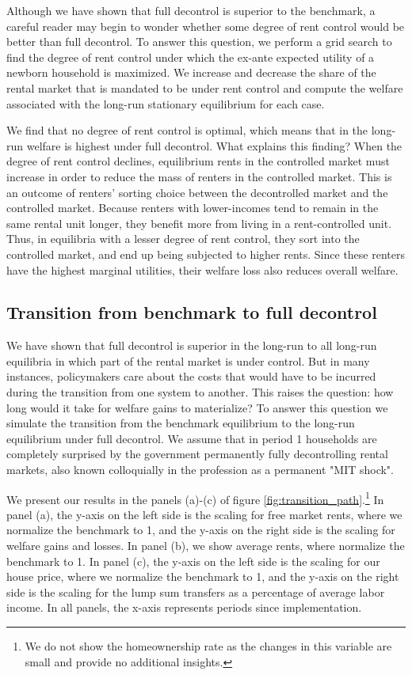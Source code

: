 \documentclass[parskip=full]{article}
\begin{document}
Although we have shown that full decontrol is superior to the benchmark, a careful reader may begin to wonder whether some degree of rent control would be better than full decontrol. To answer this question, we perform a grid search to find the degree of rent control under which the ex-ante expected utility of a newborn household is maximized. We increase and decrease the share of the rental market that is mandated to be under rent control and compute the welfare associated with the long-run stationary equilibrium for each case. 

We find that no degree of rent control is optimal, which means that in the long-run welfare is highest under full decontrol. What explains this finding? When the degree of rent control declines, equilibrium rents in the controlled market must increase in order to reduce the mass of renters in the controlled market. This is an outcome of renters' sorting choice between the decontrolled market and the controlled market. Because renters with lower-incomes tend to remain in the same rental unit longer, they benefit more from living in a rent-controlled unit. Thus, in equilibria with a lesser degree of rent control, they sort into the controlled market, and end up being subjected to higher rents. Since these renters have the highest marginal utilities, their welfare loss also reduces overall welfare. 

\subsection{Transition from benchmark to full decontrol}

We have shown that full decontrol is superior in the long-run to all long-run equilibria in which part of the rental market is under control. But in many instances, policymakers care about the costs that would have to be incurred during the transition from one system to another. This raises the question: how long would it take for welfare gains to materialize? To answer this question we simulate the transition from the benchmark equilibrium to the long-run equilibrium under full decontrol. We assume that in period 1 households are completely surprised by the government permanently fully decontrolling rental markets, also known colloquially in the profession as a permanent "MIT shock". 

We present our results in the panels (a)-(c) of figure \ref{fig:transition_path}.\footnote{We do not show the homeownership rate as the changes in this variable are small and provide no additional insights.} In panel (a), the y-axis on the left side is the scaling for free market rents, where we normalize the benchmark to 1, and the y-axis on the right side is the scaling for welfare gains and losses. In panel (b), we show average rents, where normalize the benchmark to 1. In panel (c), the y-axis on the left side is the scaling for our house price, where we normalize the benchmark to 1, and the y-axis on the right side is the scaling for the lump sum transfers as a percentage of average labor income. In all panels, the x-axis represents periods since implementation.
\end{document}

